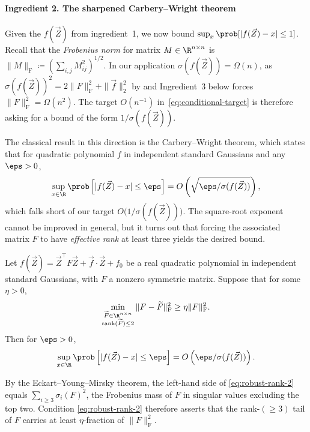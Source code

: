 \paragraph{Ingredient 2. The sharpened Carbery--Wright theorem}

Given the $f(\vec Z)$ from ingredient~1, we now bound $\sup_x \prob[|f(\vec Z) - x| \leq 1]$. Recall that the \textit{Frobenius norm} for matrix $M \in \R^{n \times n}$ is $\|M\|_{\mathrm{F}} \coloneqq \left(\sum_{i, j} M_{ij}^2\right)^{1/2}$. In our application $\sigma(f(\vec Z)) = \Omega(n)$, as $\sigma(f(\vec Z))^2 = 2\|F\|_{\mathrm{F}}^2 + \|\vec f\|_2^2$ by \cite[Lemma~11.1(2)]{Kwan_2023} and Ingredient~3 below forces $\|F\|_{\mathrm{F}}^2 = \Omega(n^2)$. The target $O(n^{-1})$ in~\eqref{eq:conditional-target} is therefore asking for a bound of the form $1/\sigma(f(\vec Z))$.

The classical result in this direction is the Carbery--Wright theorem, which states that for quadratic polynomial $f$ in independent standard Gaussians and any $\eps > 0$,
\[
  \sup_{x \in \R} \prob\left[|f(\vec Z) - x| \leq \eps\right] = O\left(\sqrt{\eps / \sigma(f(\vec Z))}\right),
\]
which falls short of our target $O\bigl(1/\sigma(f(\vec Z))\bigr)$. The square-root exponent cannot be improved in general, but it turns out that forcing the associated matrix $F$ to have \textit{effective rank} at least three yields the desired bound.

\begin{theorem}
\label{thm:sharp-CW}
  Let $f(\vec Z) = \vec Z^{\top} F \vec Z + \vec f \cdot \vec Z + f_0$ be a real quadratic polynomial in independent standard Gaussians, with $F$ a nonzero symmetric matrix. Suppose that for some $\eta > 0$,
  \begin{equation}
  \label{eq:robust-rank-2}
    \min_{\substack{\widetilde F \in \R^{n \times n} \\ \mathrm{rank}(\widetilde F) \leq 2}} \|F - \widetilde F\|_{\mathrm{F}}^2 \geq \eta \|F\|_{\mathrm{F}}^2.
  \end{equation}
  Then for $\eps > 0$,
  \[
    \sup_{x \in \R} \prob\left[|f(\vec Z) - x| \leq \eps\right] = O\left(\eps/\sigma(f(\vec Z))\right).
  \]
\end{theorem}

By the Eckart--Young--Mirsky theorem, the left-hand side of \eqref{eq:robust-rank-2} equals $\sum_{i \geq 3} \sigma_i(F)^2$, the Frobenius mass of $F$ in singular values excluding the top two. Condition \eqref{eq:robust-rank-2} therefore asserts that the rank-$(\geq 3)$ tail of $F$ carries at least $\eta$-fraction of $\|F\|_{\mathrm{F}}^2$. 

